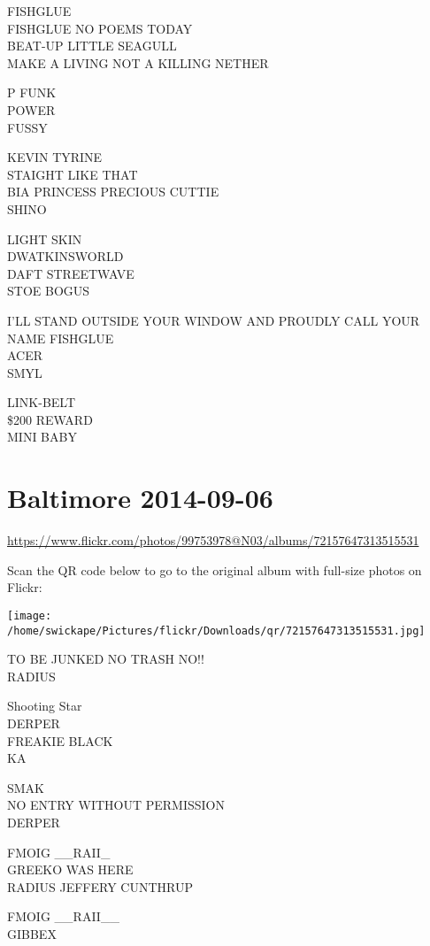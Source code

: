 \documentclass[10pt,letterpaper]{article}
\begin{document}
FISHGLUE\\
FISHGLUE NO POEMS TODAY\\
BEAT{-}UP LITTLE SEAGULL\\
MAKE A LIVING NOT A KILLING NETHER

P FUNK\\
POWER\\
FUSSY

KEVIN TYRINE\\
STAIGHT LIKE THAT\\
BIA PRINCESS PRECIOUS CUTTIE\\
SHINO

LIGHT SKIN\\
DWATKINSWORLD\\
DAFT STREETWAVE\\
STOE BOGUS

I'LL STAND OUTSIDE YOUR WINDOW AND PROUDLY CALL YOUR NAME FISHGLUE\\
ACER\\
SMYL

LINK{-}BELT\\
\$200 REWARD\\
MINI BABY


\section*{Baltimore 2014-09-06}

\url{https://www.flickr.com/photos/99753978@N03/albums/72157647313515531}

Scan the QR code below to go to the original album with full-size photos on Flickr:

\texttt{[image: /home/swickape/Pictures/flickr/Downloads/qr/72157647313515531.jpg]}


TO BE JUNKED NO TRASH NO!!\\
RADIUS

Shooting Star\\
DERPER\\
FREAKIE BLACK\\
KA

SMAK\\
NO ENTRY WITHOUT PERMISSION\\
DERPER

FMOIG \_\_RAII\_\\
GREEKO WAS HERE\\
RADIUS JEFFERY CUNTHRUP

FMOIG \_\_RAII\_\_\\
GIBBEX
\end{document}

